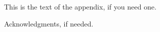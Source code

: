 \documentclass[10pt, preprint]{sigplanconf}
\begin{document}
This is the text of the appendix, if you need one.

\acks

Acknowledgments, if needed.





\begin{thebibliography}{}
\softraggedright


\end{thebibliography}
\end{document}

